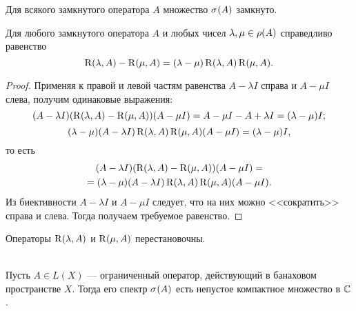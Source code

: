 \begin{corollaryth}
    Для всякого замкнутого оператора $A$ множество $\spectrum{A}$ замкнуто.
\end{corollaryth}

\begin{theorem}
    Для любого замкнутого оператора $A$ и любых чисел $\lambda, \mu \in \operatorname{\rho}(A)$ 
    справедливо равенство
    \[ \operatorname{R}(\lambda, A) - \operatorname{R}(\mu, A) 
        = (\lambda - \mu) \operatorname{R}(\lambda, A)\operatorname{R}(\mu, A). \]
\end{theorem}

\begin{proof}
    Применяя к правой и левой частям равенства $A - \lambda I$ справа и $A - \mu I$ слева, получим
    одинаковые выражения:
    \[ (A - \lambda I)(\operatorname{R}(\lambda, A) - \operatorname{R}(\mu, A))(A - \mu I) = 
    A - \mu I - A + \lambda I = (\lambda - \mu) I; \]
    \[ (\lambda - \mu)(A - \lambda I)\operatorname{R}(\lambda, A)\operatorname{R}(\mu, A)(A - \mu I) = 
    (\lambda - \mu) I, \]
    то есть
    \begin{multline*}
        (A - \lambda I)(\operatorname{R}(\lambda, A) - \operatorname{R}(\mu, A))(A - \mu I) =\\=
          (\lambda - \mu)(A - \lambda I)\operatorname{R}(\lambda, A)\operatorname{R}(\mu, A)(A - \mu I).
    \end{multline*} 
    Из биективности $A - \lambda I$ и $A - \mu I$ следует, что на них можно <<сократить>>
    справа и слева. Тогда получаем требуемое равенство.
\end{proof}

\begin{corollaryth}
    Операторы $\operatorname{R}(\lambda, A)$ и $\operatorname{R}(\mu, A)$ перестановочны.
\end{corollaryth}

\begin{theorem}\label{th:boundedspectrum}\hfill\\
    \indent Пусть $A \in L(X)$ --- ограниченный оператор, действующий в банаховом пространстве $X$.
    Тогда его спектр $\spectrum{A}$ есть непустое компактное множество в $\mathbb{C}$.
\end{theorem}

